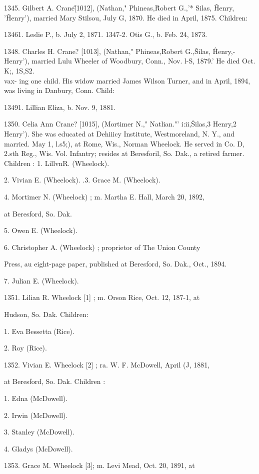1345. Gilbert A. Crane\^ [1012], (Nathan," Phineas,\^ 
Robert G.,'* Silas, \^ Henry, '\^ Henry'), married Mary Stilsou, July 
G, 1870. He died in April, 1875. Children: 

13461. Leslie P., b. July 2, 1871. 
1347-2. Otis G., b. Feb. 24, 1873. 

1348. Charles H. Crane? [1013], (Nathan," Phineas,\^ 
Robert G.,\^ Silas, \^ Henry,- Henry'), married Lulu Wheeler of 
Woodbury, Conn., Nov. l-S, 1879.' He died Oct. K;, 1S,S2. \\vax- 
ing one child. His widow married James Wilson Turner, and in 
April, 1894, was living in Danbury, Conn. Child: 

13491. Lillian Eliza, b. Nov. 9, 1881. 

1350. Celia Ann Crane? [1015], (Mortimer N.," Natlian."' 
i:ii,\^ Silas,3 Henry,2 Henry'). She was educated at Dehiiicy 
Institute, Westmoreland, N. Y., and married. May 1, l.s5;), at 
Rome, Wis., Norman Wheelock. He served in Co. D, 2.sth 
Reg., Wis. Vol. Infantry; resides at Beresforil, So. Dak., a 
retired farmer. Children : 
1. LillvnR. (Wheelock). 




2. Vivian E. (Wheelock). 
.3. Grace M. (Wheelock). 

4. Mortimer N. (Wheelock) ; m. Martha E. Hall, March 20, 1892, 

at Beresford, So. Dak. 

5. Owen E. (Wheelock). 

6. Christopher A. (Wheelock) ; proprietor of The Union County 

Press, au eight-page paper, published at Beresford, So. Dak., 
Oct., 1894. 

7. Julian E. (Wheelock). 

1351. Lilian R. Wheelock [1] ; m. Orson Rice, Oct. 12, 187-1, at 

Hudson, So. Dak. Children: 

1. Eva Bessetta (Rice). 

2. Roy (Rice). 

1352. Vivian E. Wheelock [2] ; ra. W. F. McDowell, April (J, 1881, 

at Beresford, So. Dak. Children : 

1. Edna (McDowell). 

2. Irwin (McDowell). 

3. Stanley (McDowell). 

4. Gladys (McDowell). 

1353. Grace M. Wheelock [3]; m. Levi Mead, Oct. 20, 1891, at 

